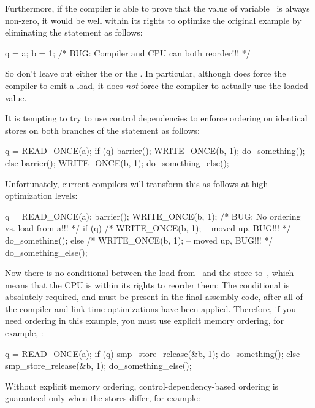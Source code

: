 Furthermore, if the compiler is able to prove that the value of
variable~ is always non-zero, it would be well within its rights
to optimize the original example by eliminating the  statement
as follows:

\begin{VerbatimU}
	q = a;
	b = 1;  /* BUG: Compiler and CPU can both reorder!!! */
\end{VerbatimU}

So don't leave out either the  or the .
In particular, although  does force the compiler to emit a
load, it does \emph{not} force the compiler to actually use the loaded value.

It is tempting to try to use control dependencies to enforce ordering on
identical stores on both branches of the  statement as follows:

\begin{VerbatimU}
	q = READ_ONCE(a);
	if (q) {
		barrier();
		WRITE_ONCE(b, 1);
		do_something();
	} else {
		barrier();
		WRITE_ONCE(b, 1);
		do_something_else();
	}
\end{VerbatimU}

Unfortunately, current compilers will transform this as follows at high
optimization levels:

\begin{VerbatimU}
	q = READ_ONCE(a);
	barrier();
	WRITE_ONCE(b, 1);  /* BUG: No ordering vs. load from a!!! */
	if (q) {
		/* WRITE_ONCE(b, 1); -- moved up, BUG!!! */
		do_something();
	} else {
		/* WRITE_ONCE(b, 1); -- moved up, BUG!!! */
		do_something_else();
	}
\end{VerbatimU}

Now there is no conditional between the load from~ and the store
to~, which means that the CPU is within its rights to reorder them:
The conditional is absolutely required, and must be present in the final
assembly code, after all of the compiler and link-time optimizations
have been applied.
Therefore, if you need ordering in this example, you must use explicit
memory ordering, for example, :

\begin{VerbatimU}
	q = READ_ONCE(a);
	if (q) {
		smp_store_release(&b, 1);
		do_something();
	} else {
		smp_store_release(&b, 1);
		do_something_else();
	}
\end{VerbatimU}

Without explicit memory ordering, control-dependency-based ordering is
guaranteed only when the stores differ, for example:

